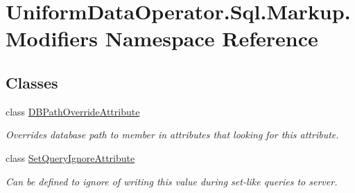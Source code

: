 \hypertarget{namespace_uniform_data_operator_1_1_sql_1_1_markup_1_1_modifiers}{}\section{Uniform\+Data\+Operator.\+Sql.\+Markup.\+Modifiers Namespace Reference}
\label{namespace_uniform_data_operator_1_1_sql_1_1_markup_1_1_modifiers}
\subsection*{Classes}
\begin{DoxyCompactItemize}
\item 
class \mbox{\hyperlink{class_uniform_data_operator_1_1_sql_1_1_markup_1_1_modifiers_1_1_d_b_path_override_attribute}{D\+B\+Path\+Override\+Attribute}}
\begin{DoxyCompactList}\small\item\em Overrides database path to member in attributes that looking for this attribute. \end{DoxyCompactList}\item 
class \mbox{\hyperlink{class_uniform_data_operator_1_1_sql_1_1_markup_1_1_modifiers_1_1_set_query_ignore_attribute}{Set\+Query\+Ignore\+Attribute}}
\begin{DoxyCompactList}\small\item\em Can be defined to ignore of writing this value during set-\/like queries to server. \end{DoxyCompactList}\end{DoxyCompactItemize}
